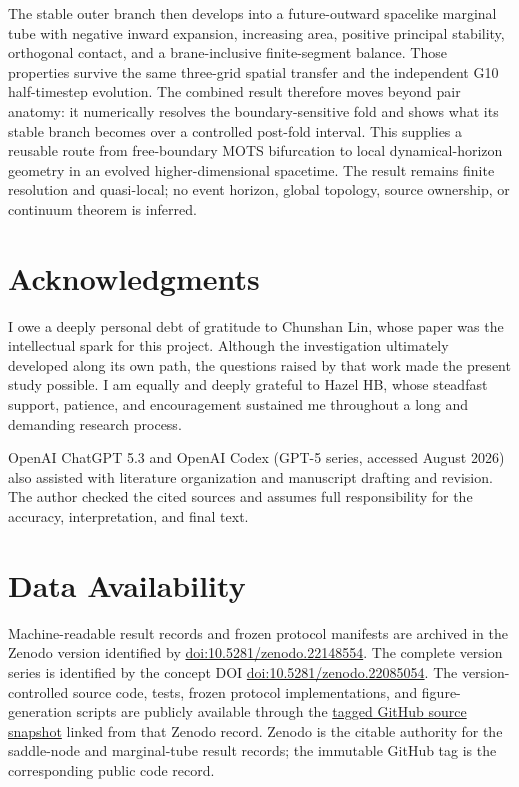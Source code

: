 \documentclass[11pt]{article}
\begin{document}
The stable outer branch then develops into a future-outward spacelike marginal
tube with negative inward expansion, increasing area, positive principal
stability, orthogonal contact, and a brane-inclusive finite-segment balance.
Those properties survive the same three-grid spatial transfer and the
independent G10 half-timestep evolution.  The combined result therefore moves
beyond pair anatomy: it numerically resolves the boundary-sensitive fold and
shows what its stable branch becomes over a controlled post-fold interval.
This supplies a reusable route from free-boundary MOTS bifurcation to local
dynamical-horizon geometry in an evolved higher-dimensional spacetime.  The
result remains finite resolution and quasi-local; no event horizon, global
topology, source ownership, or continuum theorem is inferred.

\section*{Acknowledgments}

I owe a deeply personal debt of gratitude to Chunshan Lin, whose paper
\cite{Lin2026} was the intellectual spark for this project.  Although the
investigation ultimately developed along its own path, the questions raised by
that work made the present study possible.  I am equally and deeply grateful
to Hazel HB, whose steadfast support, patience, and encouragement sustained me
throughout a long and demanding research process.

OpenAI ChatGPT 5.3 and OpenAI Codex (GPT-5 series, accessed August 2026) also
assisted with literature organization and manuscript drafting and revision.
The author checked the cited sources and assumes full responsibility for the
accuracy, interpretation, and final text.

\section*{Data Availability}

Machine-readable result records and frozen protocol manifests are archived in
the Zenodo version identified by
\href{https://doi.org/10.5281/zenodo.22148554}{doi:10.5281/zenodo.22148554}.
The complete version series is identified by the concept DOI
\href{https://doi.org/10.5281/zenodo.22085054}{doi:10.5281/zenodo.22085054}.
The version-controlled source code, tests, frozen protocol implementations,
and figure-generation scripts are publicly available through the
\href{https://github.com/RonBibb/free-boundary-mots-saddle-node/tree/zenodo-22148554}{tagged GitHub source snapshot}
linked from that Zenodo record.  Zenodo is the citable authority for the
saddle-node and marginal-tube result records; the immutable GitHub tag is the
corresponding public code record.

\small


\end{document}
